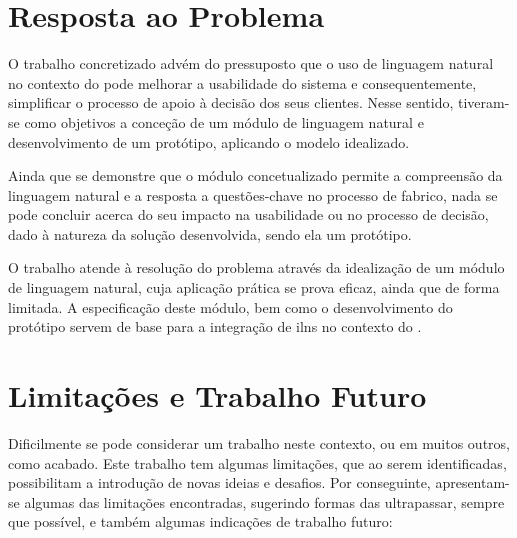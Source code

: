
\section{Resposta ao Problema} 
\label{sec:chap07_problem_response}
O trabalho concretizado advém do pressuposto que o uso de linguagem natural no contexto do {\productname} pode melhorar a usabilidade do sistema e consequentemente, simplificar o processo de apoio à decisão dos seus clientes. Nesse sentido, tiveram-se como objetivos a conceção de um módulo de linguagem natural e desenvolvimento de um protótipo, aplicando o modelo idealizado.

Ainda que se demonstre que o módulo concetualizado permite a compreensão da linguagem natural e a resposta a questões-chave no processo de fabrico, nada se pode concluir acerca do seu impacto na usabilidade ou no processo de decisão, dado à natureza da solução desenvolvida, sendo ela um protótipo.

O trabalho atende à resolução do problema através da idealização de um módulo de linguagem natural, cuja aplicação prática se prova eficaz, ainda que de forma limitada. A especificação deste módulo, bem como o desenvolvimento do protótipo servem de base para a integração de \glspl{iln} no contexto do {\productname}.

\section{Limitações e Trabalho Futuro} 
\label{sec:chap07_future_work_limitations}
Dificilmente se pode considerar um trabalho neste contexto, ou em muitos outros, como acabado. Este trabalho tem algumas limitações, que ao serem identificadas, possibilitam a introdução de novas ideias e desafios. Por conseguinte, apresentam-se algumas das limitações encontradas, sugerindo formas das ultrapassar, sempre que possível, e também algumas indicações de trabalho futuro:

